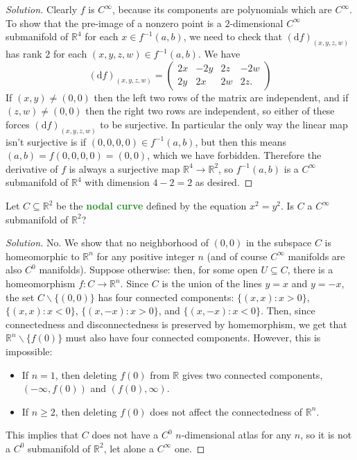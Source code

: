 \documentclass[10pt]{scrartcl}
\providecommand{\RR}{\mathbb R}
\providecommand{\ii}{\item}
\providecommand{\setdiff}{\smallsetminus}
\providecommand{\inv}{^{-1}}
\newenvironment{soln}{\begin{proof}[Solution]}{\end{proof}}
\providecommand{\vocab}[1]{{\textbf{\textcolor{ForestGreen}{#1}}}}
\begin{document}
\begin{soln}
	Clearly $f$ is $C^\infty$, because its components are polynomials
	which are $C^\infty$. To show that the pre-image of a nonzero point
	is a $2$-dimensional $C^\infty$ submanifold of $\RR^4$
	for each $x\in f\inv(a,b)$, we need to check that $(\mathrm df)_{(x,y,z,w)}$
	has rank $2$ for each $(x,y,z,w)\in f\inv(a,b)$. We have
	\[(\mathrm df)_{(x,y,z,w)} = \begin{pmatrix}
		2x&-2y&2z&-2w\\
		2y&2x&2w&2z.
	\end{pmatrix}\]
	If $(x,y)\ne(0,0)$ then the left two rows of the matrix are independent,
	and if $(z,w)\ne(0,0)$ then the right two rows are independent,
	so either of these forces $(\mathrm df)_{(x,y,z,w)}$ to be surjective.
	In particular the only way the linear map isn't surjective
	is if $(0,0,0,0)\in f\inv(a,b)$, but then this means
	$(a,b) = f(0,0,0,0) = (0,0)$, which we have forbidden.
	Therefore the derivative of $f$ is always a surjective map
	$\RR^4\to\RR^2$, so $f\inv(a,b)$ is a $C^\infty$ submanifold of $\RR^4$
	with dimension $4-2=2$ as desired.
\end{soln}

\begin{problem}
	Let $C\subseteq\RR^2$ be the \vocab{nodal curve}
	defined by the equation $x^2=y^2$. Is $C$ a $C^\infty$ submanifold
	of $\RR^2$?
\end{problem}

\begin{soln}
	No. We show that no neighborhood of $(0,0)$ in the subspace $C$
	is homeomorphic to $\RR^n$ for any positive integer $n$
	(and of course $C^\infty$ manifolds are also $C^0$ manifolds).
	Suppose otherwise: then, for some open $U\subseteq C$,
	there is a homeomorphism $f\colon C\to\RR^n$.
	Since $C$ is the union of the lines $y=x$ and $y=-x$,
	the set $C\setdiff\{(0,0)\}$ has four connected components:
	$\{(x,x) : x > 0\}$, $\{(x,x) : x < 0\}$, $\{(x, -x) : x>0\}$,
	and $\{(x,-x) : x < 0\}$.
	Then, since connectedness and disconnectedness
	is preserved by homemorphism, we get that $\RR^n\setdiff\{f(0)\}$
	must also have four connected components.
	However, this is impossible:
	\begin{itemize}
		\ii If $n = 1$, then deleting $f(0)$ from $\RR$
		gives two connected components, $(-\infty,f(0))$ and $(f(0),\infty)$.
		\ii If $n\ge 2$, then deleting $f(0)$ does not affect the
		connectedness of $\RR^n$.
	\end{itemize}
	This implies that $C$ does not have a $C^0$
	$n$-dimensional atlas for any $n$,
	so it is not a $C^0$ submanifold of $\RR^2$, let alone a $C^\infty$ one.
\end{soln}
\end{document}
